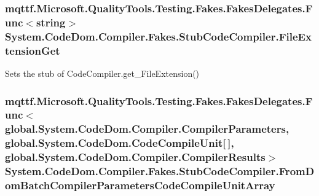 \hypertarget{class_system_1_1_code_dom_1_1_compiler_1_1_fakes_1_1_stub_code_compiler_ada9b977e63d6bedafb9ce7e72bd43635}{
\subsubsection[{File\-Extension\-Get}]{\setlength{\rightskip}{0pt plus 5cm}mqttf.\-Microsoft.\-Quality\-Tools.\-Testing.\-Fakes.\-Fakes\-Delegates.\-Func$<$string$>$ System.\-Code\-Dom.\-Compiler.\-Fakes.\-Stub\-Code\-Compiler.\-File\-Extension\-Get}}\label{class_system_1_1_code_dom_1_1_compiler_1_1_fakes_1_1_stub_code_compiler_ada9b977e63d6bedafb9ce7e72bd43635}


Sets the stub of Code\-Compiler.\-get\-\_\-\-File\-Extension()

\hypertarget{class_system_1_1_code_dom_1_1_compiler_1_1_fakes_1_1_stub_code_compiler_aed057f272ff5abb624bb3f01efb03d2c}{
\subsubsection[{From\-Dom\-Batch\-Compiler\-Parameters\-Code\-Compile\-Unit\-Array}]{\setlength{\rightskip}{0pt plus 5cm}mqttf.\-Microsoft.\-Quality\-Tools.\-Testing.\-Fakes.\-Fakes\-Delegates.\-Func$<$global.\-System.\-Code\-Dom.\-Compiler.\-Compiler\-Parameters, global.\-System.\-Code\-Dom.\-Code\-Compile\-Unit\mbox{[}$\,$\mbox{]}, global.\-System.\-Code\-Dom.\-Compiler.\-Compiler\-Results$>$ System.\-Code\-Dom.\-Compiler.\-Fakes.\-Stub\-Code\-Compiler.\-From\-Dom\-Batch\-Compiler\-Parameters\-Code\-Compile\-Unit\-Array}}\label{class_system_1_1_code_dom_1_1_compiler_1_1_fakes_1_1_stub_code_compiler_aed057f272ff5abb624bb3f01efb03d2c}


